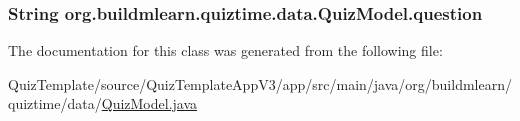 \subsubsection[{\texorpdfstring{question}{question}}]{\setlength{\rightskip}{0pt plus 5cm}String org.\+buildmlearn.\+quiztime.\+data.\+Quiz\+Model.\+question\hspace{0.3cm}{\ttfamily [private]}}\hypertarget{classorg_1_1buildmlearn_1_1quiztime_1_1data_1_1QuizModel_a766d7c74280ac9f78f0ef37b81a98992}{}\label{classorg_1_1buildmlearn_1_1quiztime_1_1data_1_1QuizModel_a766d7c74280ac9f78f0ef37b81a98992}


The documentation for this class was generated from the following file\+:\begin{DoxyCompactItemize}
\item 
Quiz\+Template/source/\+Quiz\+Template\+App\+V3/app/src/main/java/org/buildmlearn/quiztime/data/\hyperlink{QuizModel_8java}{Quiz\+Model.\+java}\end{DoxyCompactItemize}
